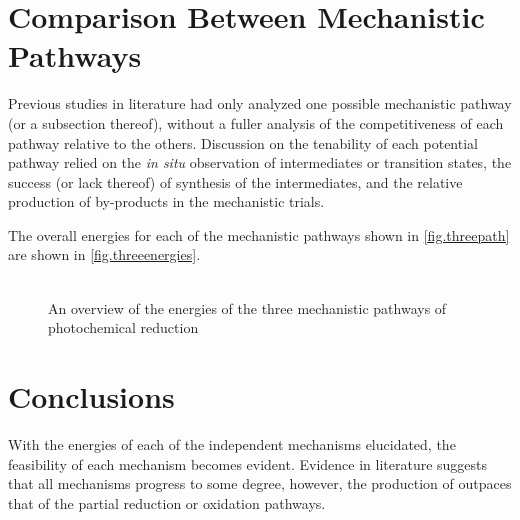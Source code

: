 

\section{Comparison Between Mechanistic Pathways} \label{sec.compare}

Previous studies in literature had only analyzed one possible mechanistic pathway (or a subsection thereof), without a fuller analysis of the competitiveness of each pathway relative to the others. Discussion on the tenability of each potential pathway relied on the \textit{in situ} observation of intermediates or transition states, the success (or lack thereof) of synthesis of the intermediates, and the relative production of by-products in the mechanistic trials.

The overall energies for each of the mechanistic pathways shown in \autoref{fig.threepath} are shown in \autoref{fig.threeenergies}. 

\begin{figure}[!htbp]
 \begin{center}
  \includegraphics[clip=true]{images/insertgraphic.eps}
 \end{center}
\caption[Reaction energies for three mechanistic pathways]{An overview of the energies of the three mechanistic pathways of photochemical  reduction}
\label{fig.threeenergies}
\end{figure} 

\section{Conclusions} 

With the energies of each of the independent mechanisms elucidated, the feasibility of each mechanism becomes evident. Evidence in literature suggests that all mechanisms progress to some degree, however, the production of  outpaces that of the partial reduction or oxidation pathways. 
